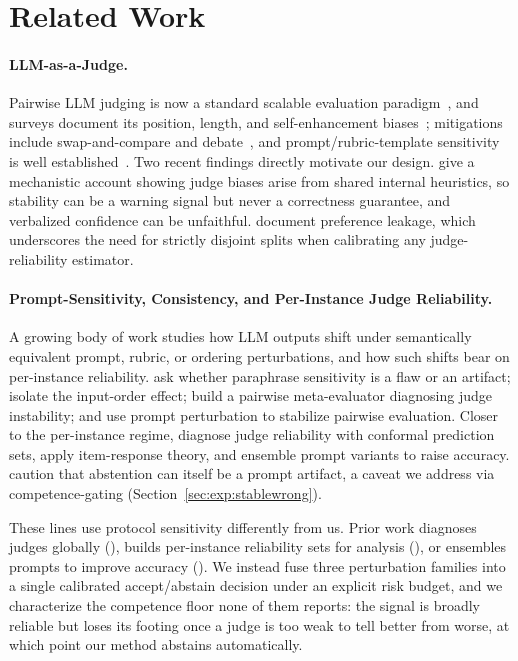 
\section{Related Work}
\label{sec:related}

\paragraph{LLM-as-a-Judge.}
Pairwise LLM judging is now a standard scalable evaluation paradigm~\citep{zheng2023judging}, and surveys document its position, length, and self-enhancement biases~\citep{li2024llmsasjudges}; mitigations include swap-and-compare and debate~\citep{wang2023faireval}, and prompt/rubric-template sensitivity is well established~\citep{wei2024systematic}. Two recent findings directly motivate our design. \citet{xu2026inside} give a mechanistic account showing judge biases arise from shared internal heuristics, so stability can be a warning signal but never a correctness guarantee, and verbalized confidence can be unfaithful. \citet{li2025preference} document preference leakage, which underscores the need for strictly disjoint splits when calibrating any judge-reliability estimator.

\paragraph{Prompt-Sensitivity, Consistency, and Per-Instance Judge Reliability.}
A growing body of work studies how LLM outputs shift under semantically equivalent prompt, rubric, or ordering perturbations, and how such shifts bear on per-instance reliability. \citet{hua2025flaw} ask whether paraphrase sensitivity is a flaw or an artifact; \citet{bryan2025order} isolate the input-order effect; \citet{anghel2025diagnosing} build a pairwise meta-evaluator diagnosing judge instability; and \citet{huang2026prompt} use prompt perturbation to stabilize pairwise evaluation. Closer to the per-instance regime, \citet{gupta2026diagnosing} diagnose judge reliability with conformal prediction sets, \citet{choi2026diagnosing} apply item-response theory, and \citet{li2025autoprompt} ensemble prompt variants to raise accuracy. \citet{ling2025abstention} caution that abstention can itself be a prompt artifact, a caveat we address via competence-gating (Section~\ref{sec:exp:stablewrong}).

These lines use protocol sensitivity differently from us. Prior work diagnoses judges globally (\citealp{hua2025flaw,bryan2025order,anghel2025diagnosing}), builds per-instance reliability sets for analysis (\citealp{gupta2026diagnosing,choi2026diagnosing}), or ensembles prompts to improve accuracy (\citealp{li2025autoprompt,huang2026prompt}). We instead fuse three perturbation families into a single calibrated accept/abstain decision under an explicit risk budget, and we characterize the competence floor none of them reports: the signal is broadly reliable but loses its footing once a judge is too weak to tell better from worse, at which point our method abstains automatically.

